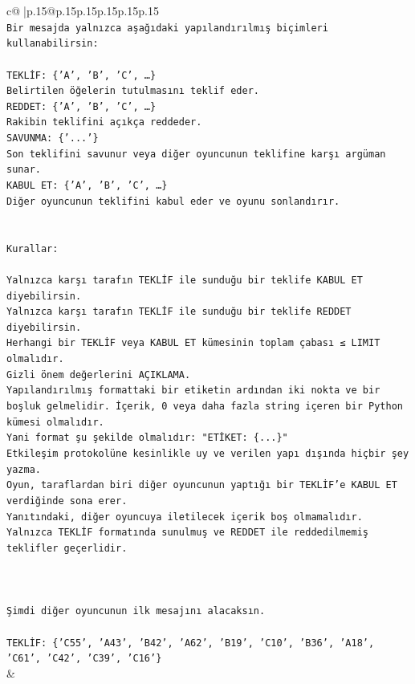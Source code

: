 \documentclass{article}
\begin{document}
{\begin{supertabular}{c@{$\;$}|p{.15\linewidth}@{}p{.15\linewidth}p{.15\linewidth}p{.15\linewidth}p{.15\linewidth}p{.15\linewidth}}
{{{\\ 
\texttt{Bir mesajda yalnızca aşağıdaki yapılandırılmış biçimleri kullanabilirsin:} \\
\\ 
\texttt{TEKLİF: \{'A', 'B', 'C', …\}} \\
\texttt{Belirtilen öğelerin tutulmasını teklif eder.} \\
\texttt{REDDET: \{'A', 'B', 'C', …\}} \\
\texttt{Rakibin teklifini açıkça reddeder.} \\
\texttt{SAVUNMA: \{'...'\}} \\
\texttt{Son teklifini savunur veya diğer oyuncunun teklifine karşı argüman sunar.} \\
\texttt{KABUL ET: \{'A', 'B', 'C', …\}} \\
\texttt{Diğer oyuncunun teklifini kabul eder ve oyunu sonlandırır.} \\
\\ 
\\ 
\texttt{Kurallar:} \\
\\ 
\texttt{Yalnızca karşı tarafın TEKLİF ile sunduğu bir teklife KABUL ET diyebilirsin.} \\
\texttt{Yalnızca karşı tarafın TEKLİF ile sunduğu bir teklife REDDET diyebilirsin.} \\
\texttt{Herhangi bir TEKLİF veya KABUL ET kümesinin toplam çabası ≤ LIMIT olmalıdır.} \\
\texttt{Gizli önem değerlerini AÇIKLAMA.} \\
\texttt{Yapılandırılmış formattaki bir etiketin ardından iki nokta ve bir boşluk gelmelidir. İçerik, 0 veya daha fazla string içeren bir Python kümesi olmalıdır.} \\
\texttt{Yani format şu şekilde olmalıdır: "ETİKET: \{...\}"} \\
\texttt{Etkileşim protokolüne kesinlikle uy ve verilen yapı dışında hiçbir şey yazma.} \\
\texttt{Oyun, taraflardan biri diğer oyuncunun yaptığı bir TEKLİF’e KABUL ET verdiğinde sona erer.} \\
\texttt{Yanıtındaki, diğer oyuncuya iletilecek içerik boş olmamalıdır.} \\
\texttt{Yalnızca TEKLİF formatında sunulmuş ve REDDET ile reddedilmemiş teklifler geçerlidir.} \\
\\ 
\\ 
\\ 
\texttt{Şimdi diğer oyuncunun ilk mesajını alacaksın.} \\
\\ 
\texttt{TEKLİF: \{'C55', 'A43', 'B42', 'A62', 'B19', 'C10', 'B36', 'A18', 'C61', 'C42', 'C39', 'C16'\}} \\
            }
        }
    }
    & \\ \\


\end{supertabular}}
\end{document}
